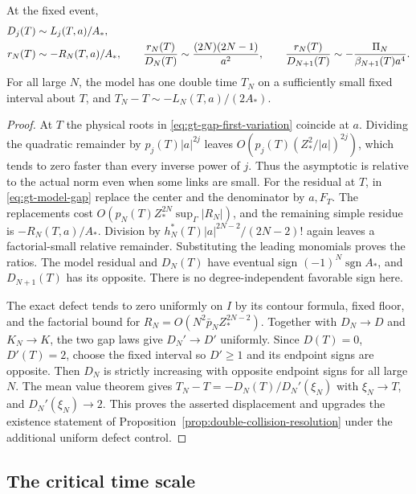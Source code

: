 \begin{proposition}
\label{prop:gt-fixed-event}
At the fixed event,
\begin{align}
 D_j(T)&\sim L_j(T,a)/A_* ,\notag\\
 r_N(T)&\sim -R_N(T,a)/A_* ,\qquad
 \frac{r_N(T)}{D_N(T)}
       \sim\frac{(2N)(2N-1)}{a^2},\qquad
 \frac{r_N(T)}{D_{N+1}(T)}
       \sim-\frac{\Pi_N}{\beta_{N+1}(T)a^4}.
 \label{eq:gt-fixed-ratios}
\end{align}
For all large \(N\), the model has one double time \(T_N\) on a
sufficiently small fixed interval about \(T\), and
\(T_N-T\sim-L_N(T,a)/(2A_*)\).
\end{proposition}
\begin{proof}
At \(T\) the physical roots in \eqref{eq:gt-gap-first-variation}
coincide at \(a\). Dividing the quadratic remainder by
\(p_j(T)|a|^{2j}\) leaves
\(O(p_j(T)(Z_*^2/|a|)^{2j})\), which tends to zero faster
than every inverse power of \(j\). Thus the asymptotic is relative
to the actual norm even when some links are small. For the residual
at \(T\), in \eqref{eq:gt-model-gap} replace the center and the
denominator by \(a,F_T\). The replacements cost
\(O(p_N(T)Z_*^{2N}\sup_\Gamma|R_N|)\), and the remaining simple
residue is \(-R_N(T,a)/A_*\). Division by
\(h_N^*(T)|a|^{2N-2}/(2N-2)!\) again leaves a factorial-small
relative remainder. Substituting the leading monomials proves the
ratios. The model residual and \(D_N(T)\) have eventual sign
\((-1)^N\operatorname{sgn}A_*\), and \(D_{N+1}(T)\) has its
opposite. There is no degree-independent favorable sign here.

The exact defect tends to zero uniformly on \(I\) by its contour
formula, fixed floor, and the factorial bound for
\(R_N=O(N^2\bar p_N Z_*^{2N-2})\). Together with \(D_N\to D\)
and \(K_N\to K\), the two gap laws give \(D_N'\to D'\) uniformly.
Since \(D(T)=0\), \(D'(T)=2\), choose the fixed interval so
\(D'\ge1\) and its endpoint signs are opposite. Then \(D_N\)
is strictly increasing with opposite endpoint signs for all large
\(N\). The mean value theorem gives
\(T_N-T=-D_N(T)/D_N'(\xi_N)\) with \(\xi_N\to T\), and
\(D_N'(\xi_N)\to2\). This proves the asserted displacement and
upgrades the existence statement of
Proposition~\ref{prop:double-collision-resolution} under the
additional uniform defect control.
\end{proof}

\subsection{The critical time scale}

